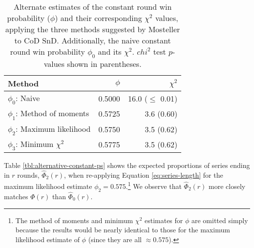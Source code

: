 \documentclass{article}
\begin{document}
\begin{table}

\caption{Alternate estimates of the constant round win probability ($\phi$) and their corresponding $\chi^2$ values, applying the three methods suggested by Mosteller to CoD SnD. Additionally, the naive constant round win probability $\phi_0$ and its $\chi^2$. $chi^2$ test $p$-values shown in parentheses.}

\centering
\begin{tabular}{lrr}
\toprule
Method & $\phi$ & $\chi^2$ \\
\midrule

$\phi_0$: Naive & 0.5000 & 16.0 ($\leq$ 0.01) \\
$\phi_1$: Method of moments & 0.5725 & 3.6 (0.60) \\
$\phi_2$: Maximum likelihood & 0.5750 & 3.5 (0.62) \\
$\phi_3$: Minimum $\chi^2$ & 0.5775 & 3.5 (0.62) \\

\bottomrule
\end{tabular}

\label{tbl:mosteller-methods-results}

\end{table}

Table \ref{tbl:alternative-constant-ps} shows the expected proportions
of series ending in \(r\) rounds, \(\hat{\Phi}_2(r)\), when re-applying
Equation \ref{eq:series-length} for the maximum likelihood estimate
\(\phi_2 = 0.575\).\footnote{The method of moments and minimum
  \(\chi^2\) estimates for \(\phi\) are omitted simply because the
  results would be nearly identical to those for the maximum likelihood
  estimate of \(\phi\) (since they are all \(\approx 0.575\)).} We
observe that \(\hat{\Phi}_2(r)\) more closely matches \(\Phi(r)\) than
\(\hat{\Phi}_0(r)\).
\end{document}
